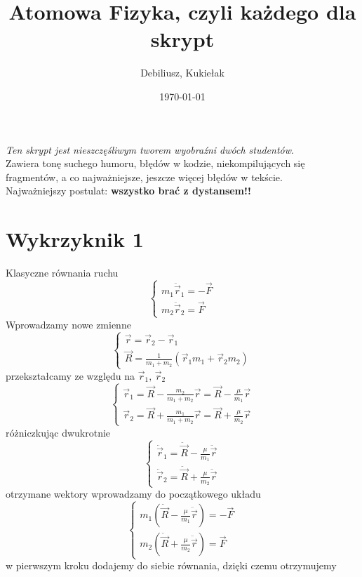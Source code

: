 \documentclass[a4paper,12pt]{article}
\title{Atomowa Fizyka, czyli każdego dla skrypt} %
\author{Debiliusz, Kukiełak} %
\date{\today} %
\begin{document}
	\maketitle
    \textit{Ten skrypt jest nieszczęśliwym tworem wyobraźni dwóch studentów}. \\
    Zawiera tonę suchego humoru, błędów w kodzie, niekompilujących się 
    fragmentów, a co najważniejsze, jeszcze więcej błędów w tekście.\\
    Najważniejszy postulat: \textbf{wszystko brać z dystansem!!}
    
\section{Wykrzyknik 1}\label{sec:1}
	Klasyczne równania ruchu 
		$$
		\left\{
			\begin{array}{l}
				m_1 \ddot{\vec{r}}_1 = - \vec{F} \\
				m_2 \ddot{\vec{r}}_2 = \vec{F}
			\end{array}	
		\right.
		$$
	Wprowadzamy nowe zmienne
		$$
		\left\{
			\begin{array}{l}
				\vec{r} = \vec{r}_2-\vec{r}_1\\
				\vec{R} = \frac{1}{m_1 + m_2}\left(\vec{r}_1 m_1 + \vec{r}_2 m_2\right)
			\end{array}
		\right.
		$$
	przekształcamy ze względu na $\vec{r}_1,\,\vec{r}_2$
		$$
		\left\{
			\begin{array}{l}
				\vec{r}_1 = \vec{R} - \frac{m_2}{m_1+m_2}\vec{r} = \vec{R} - \frac{\mu}{m_1}\vec{r}\\
				\vec{r}_2 = \vec{R} + \frac{m_1}{m_1+m_2}\vec{r} = \vec{R} + \frac{\mu}{m_2}\vec{r}
			\end{array}
		\right.
		$$
	różniczkując dwukrotnie
		$$
		\left\{
			\begin{array}{l}
				\ddot{\vec{r}}_1 = \ddot{\vec{R}} -  \frac{\mu}{m_1}\ddot{\vec{r}}\\
				\ddot{\vec{r}}_2 = \ddot{\vec{R}}  + \frac{\mu}{m_2}\ddot{\vec{r}}
			\end{array}
		\right.
		$$
	otrzymane wektory wprowadzamy do początkowego układu
		$$
		\left\{
			\begin{array}{l}
				m_1\left( \ddot{\vec{R}} -  \frac{\mu}{m_1}\ddot{\vec{r}} \right)= - \vec{F} \\
				m_2\left(\ddot{\vec{R}}  + \frac{\mu}{m_2}\ddot{\vec{r}} \right)= \vec{F}
			\end{array}	
		\right.
		$$
	w pierwszym kroku dodajemy do siebie równania, dzięki czemu otrzymujemy
\end{document}
